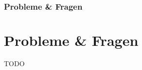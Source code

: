 

\begin{frame}

    \frametitle{Probleme \& Fragen}
    \section{Probleme \& Fragen}\label{sec:probleme-&-fragen}

    TODO


\end{frame}
